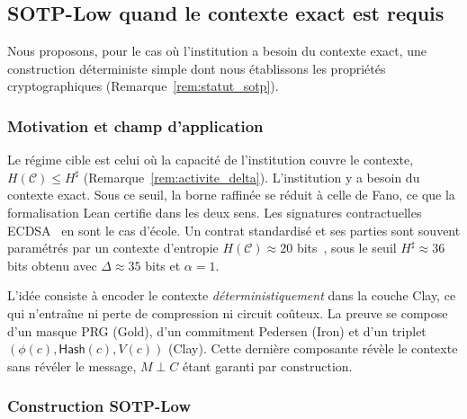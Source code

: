 \subsection{SOTP-Low quand le contexte exact est requis}
\label{subsec:sotp_low}
\begin{sloppypar}
Nous proposons, pour le cas o\`u l'institution a besoin du contexte exact, une construction
d\'eterministe simple dont nous \'etablissons les propri\'et\'es cryptographiques
(Remarque~\ref{rem:statut_sotp}).

\subsubsection{Motivation et champ d'application}
\label{subsubsec:motivation_low}

Le r\'egime cible est celui o\`u la capacit\'e de l'institution couvre le contexte,
$H(\mathcal{C}) \leq H^\sharp$ (Remarque~\ref{rem:activite_delta}). L'institution y a besoin du contexte
exact. Sous ce seuil, la borne raffin\'ee se r\'eduit \`a celle de Fano, ce que la formalisation Lean
certifie dans les deux sens. Les signatures contractuelles ECDSA~\cite{Johnson01,NIST.FIPS.186-5}
en sont le cas d'\'ecole. Un contrat standardis\'e et ses parties sont souvent param\'etr\'es par un
contexte d'entropie $H(\mathcal{C}) \approx 20$ bits~\cite{Mason07,Kerr04}, sous le seuil
$H^\sharp \approx 36$ bits obtenu avec $\Delta \approx 35$ bits et $\alpha = 1$.

L'id\'ee consiste \`a encoder le contexte \emph{d\'eterministiquement} dans la couche Clay,
ce qui n'entra\^ine ni perte de compression ni circuit co\^uteux. La preuve se compose d'un masque PRG
(Gold), d'un commitment Pedersen (Iron) et d'un triplet $(\phi(c), \mathsf{Hash}(c), V(c))$
(Clay). Cette derni\`ere composante r\'ev\`ele le contexte sans r\'ev\'eler le message,
$M \perp C$ \'etant garanti par construction.

\subsubsection{Construction SOTP-Low}
\label{subsubsec:construction_low}


\end{sloppypar}
